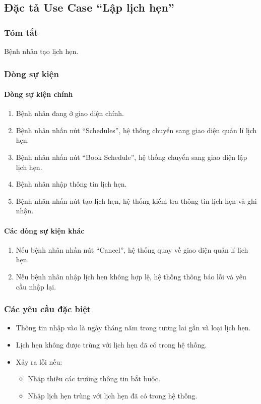 \subsection{Đặc tả Use Case ``Lập lịch hẹn''}

\subsubsection{Tóm tắt}
Bệnh nhân tạo lịch hẹn.

\subsubsection{Dòng sự kiện}
\paragraph{\textbf{Dòng sự kiện chính}}
\begin{enumerate}
  \item Bệnh nhân đang ở giao diện chính.
  \item Bệnh nhân nhấn nút ``Schedules'', hệ thống chuyển sang giao diện quản lí lịch hẹn.
  \item Bệnh nhân nhấn nút ``Book Schedule'', hệ thống chuyển sang giao diện lập lịch hẹn.
  \item Bệnh nhân nhập thông tin lịch hẹn.
  \item Bệnh nhân nhấn nút tạo lịch hẹn, hệ thống kiểm tra thông tin lịch hẹn và ghi nhận.
\end{enumerate}

\paragraph{\textbf{Các dòng sự kiện khác}}
\begin{enumerate}
  \item Nếu bệnh nhân nhấn nút ``Cancel'', hệ thống quay về giao diện quản lí lịch hẹn.
  \item Nếu bệnh nhân nhập lịch hẹn không hợp lệ, hệ thống thông báo lỗi và yêu cầu nhập lại.
\end{enumerate}

\subsubsection{Các yêu cầu đặc biệt}
\begin{itemize}
  \item Thông tin nhập vào là ngày tháng năm trong tương lai gần và loại lịch hẹn.
  \item Lịch hẹn không được trùng với lịch hẹn đã có trong hệ thống.
  \item Xảy ra lỗi nếu:
  \begin{itemize}
    \item Nhập thiếu các trường thông tin bắt buộc.
    \item Nhập lịch hẹn trùng với lịch hẹn đã có trong hệ thống.
  \end{itemize}
\end{itemize}

